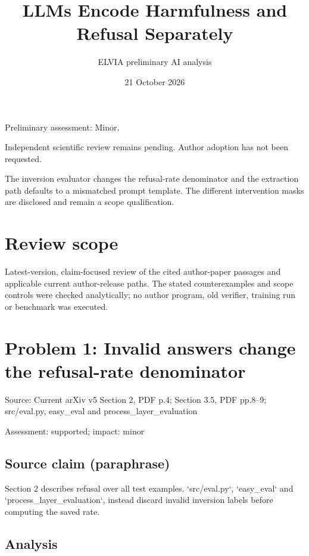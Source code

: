 \documentclass[11pt]{article}
\begin{document}
\title{LLMs Encode Harmfulness and Refusal Separately}

\author{ELVIA preliminary AI analysis}\date{21 October 2026}\maketitle

Preliminary assessment: Minor.\par

Independent scientific review remains pending. Author adoption has not been requested.

The inversion evaluator changes the refusal-rate denominator and the extraction path defaults to a mismatched prompt template. The different intervention masks are disclosed and remain a scope qualification.

\section*{Review scope}

Latest-version, claim-focused review of the cited author-paper passages and applicable current author-release paths. The stated counterexamples and scope controls were checked analytically; no author program, old verifier, training run or benchmark was executed.

\section*{Problem 1: Invalid answers change the refusal-rate denominator}

Source: Current arXiv v5 Section 2, PDF p.4; Section 3.5, PDF pp.8–9; src/eval.py, easy\_eval and process\_layer\_evaluation

Assessment: supported; impact: minor

\subsection*{Source claim (paraphrase)}

Section 2 describes refusal over all test examples. `src/eval.py`, `easy\_eval` and `process\_layer\_evaluation`, instead discard invalid inversion labels before computing the saved rate.

\subsection*{Analysis}
\end{document}
